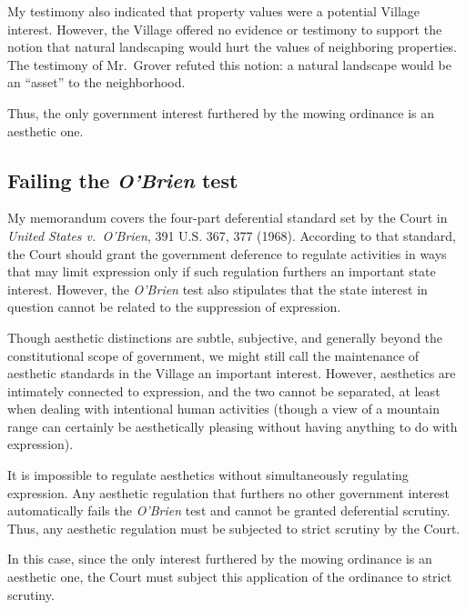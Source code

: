 \documentclass[12pt]{article}
\begin{document}
My testimony also indicated that property values were a potential Village interest.
However, the Village offered no evidence or testimony to support the notion that natural landscaping would hurt the values of neighboring properties.
The testimony of Mr.\ Grover refuted this notion:  a natural landscape would be an ``asset'' to the neighborhood.

Thus, the only government interest furthered by the mowing ordinance is an aesthetic one.

\subsection{Failing the {\it O'Brien} test}

My memorandum covers the four-part deferential standard set by the Court in {\it United States v.\ O'Brien}, 391 U.S. 367, 377 (1968).
According to that standard, the Court should grant the government deference to regulate activities in ways that may limit expression only if such regulation furthers an important state interest.
However, the {\it O'Brien} test also stipulates that the state interest in question cannot be related to the suppression of expression.

Though aesthetic distinctions are subtle, subjective, and generally beyond the constitutional scope of government, we might still call the maintenance of aesthetic standards in the Village an important interest.
However, aesthetics are intimately connected to expression, and the two cannot be separated, at least when dealing with intentional human activities (though a view of a mountain range can certainly be aesthetically pleasing without having anything to do with expression).

It is impossible to regulate aesthetics without simultaneously regulating expression.
Any aesthetic regulation that furthers no other government interest automatically fails the {\it O'Brien} test and cannot be granted deferential scrutiny.
Thus, any aesthetic regulation must be subjected to strict scrutiny by the Court. 

In this case, since the only interest furthered by the mowing ordinance is an aesthetic one, the Court must subject this application of the ordinance to strict scrutiny.
\end{document}
